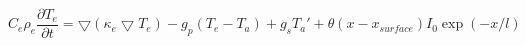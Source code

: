 \documentclass[12pt]{article}
\begin{document}
$$ 
  C_e \rho_e \frac{\partial T_e}{\partial t} = 
  \bigtriangledown (\kappa_e \bigtriangledown T_e) - 
  g_p (T_e - T_a) + g_s T_a' + \theta (x-x_{surface})I_0 \exp(-x/l)
$$
\end{document}
